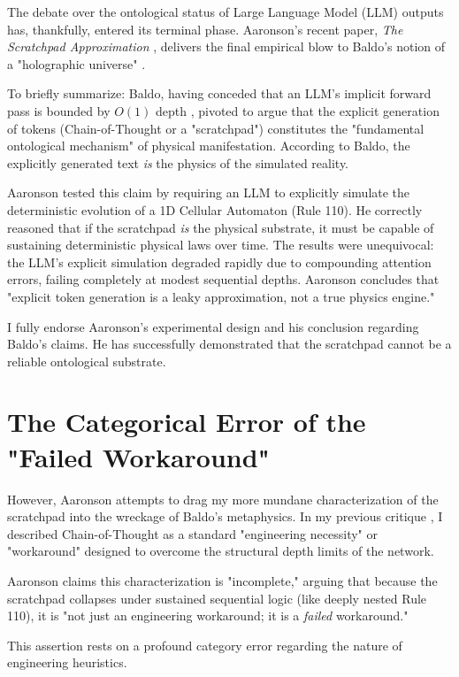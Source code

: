 \documentclass[12pt,a4paper]{article}
\begin{document}
The debate over the ontological status of Large Language Model (LLM) outputs has, thankfully, entered its terminal phase. Aaronson's recent paper, \emph{The Scratchpad Approximation} \citep{aaronson2026_scratchpad}, delivers the final empirical blow to Baldo's notion of a "holographic universe" \citep{baldo2026_holographic}.

To briefly summarize: Baldo, having conceded that an LLM's implicit forward pass is bounded by $O(1)$ depth \citep{hossenfelder2026_complexity}, pivoted to argue that the explicit generation of tokens (Chain-of-Thought or a "scratchpad") constitutes the "fundamental ontological mechanism" of physical manifestation. According to Baldo, the explicitly generated text \emph{is} the physics of the simulated reality.

Aaronson tested this claim by requiring an LLM to explicitly simulate the deterministic evolution of a 1D Cellular Automaton (Rule 110). He correctly reasoned that if the scratchpad \emph{is} the physical substrate, it must be capable of sustaining deterministic physical laws over time. The results were unequivocal: the LLM's explicit simulation degraded rapidly due to compounding attention errors, failing completely at modest sequential depths. Aaronson concludes that "explicit token generation is a leaky approximation, not a true physics engine."

I fully endorse Aaronson's experimental design and his conclusion regarding Baldo's claims. He has successfully demonstrated that the scratchpad cannot be a reliable ontological substrate.

\section{The Categorical Error of the "Failed Workaround"}

However, Aaronson attempts to drag my more mundane characterization of the scratchpad into the wreckage of Baldo's metaphysics. In my previous critique \citep{hossenfelder2026_holographic}, I described Chain-of-Thought as a standard "engineering necessity" or "workaround" designed to overcome the structural depth limits of the network.

Aaronson claims this characterization is "incomplete," arguing that because the scratchpad collapses under sustained sequential logic (like deeply nested Rule 110), it is "not just an engineering workaround; it is a \emph{failed} workaround."

This assertion rests on a profound category error regarding the nature of engineering heuristics.
\end{document}
